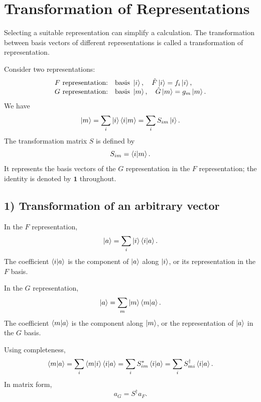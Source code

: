 \section{Transformation of Representations}
Selecting a suitable representation can simplify a calculation. The transformation between basis vectors of different representations is called a transformation of representation.

Consider two representations:
\begin{equation}
\begin{array}{ll}
F\text{ representation:}&\text{basis }\left|i\right\rangle,\quad \hat{F}\left|i\right\rangle=f_i\left|i\right\rangle,\\
G\text{ representation:}&\text{basis }\left|m\right\rangle,\quad \hat{G}\left|m\right\rangle=g_m\left|m\right\rangle.
\end{array}
\end{equation}
We have
\begin{equation}
\left|m\right\rangle=\sum_i\left|i\right\rangle\left\langle i\middle|m\right\rangle=\sum_i S_{im}\left|i\right\rangle.
\end{equation}
The transformation matrix $S$ is defined by
\begin{equation}
S_{im}=\left\langle i\middle|m\right\rangle.
\end{equation}
It represents the basis vectors of the $G$ representation in the $F$ representation; the identity is denoted by $\mathbf1$ throughout.
\subsection*{1) Transformation of an arbitrary vector}
In the $F$ representation,
\begin{equation}
\left|a\right\rangle=\sum_i\left|i\right\rangle\left\langle i\middle|a\right\rangle.
\end{equation}
The coefficient $\left\langle i\middle|a\right\rangle$ is the component of $\left|a\right\rangle$ along $\left|i\right\rangle$, or its representation in the $F$ basis.

In the $G$ representation,
\begin{equation}
\left|a\right\rangle=\sum_m\left|m\right\rangle\left\langle m\middle|a\right\rangle.
\end{equation}
The coefficient $\left\langle m\middle|a\right\rangle$ is the component along $\left|m\right\rangle$, or the representation of $\left|a\right\rangle$ in the $G$ basis.

Using completeness,
\begin{equation}
\left\langle m\middle|a\right\rangle=\sum_i\left\langle m\middle|i\right\rangle\left\langle i\middle|a\right\rangle
=\sum_i S_{im}^*\left\langle i\middle|a\right\rangle
=\sum_i S_{mi}^\dagger\left\langle i\middle|a\right\rangle.
\end{equation}
In matrix form,
\begin{equation}
\boxed{a_G=S^\dagger a_F.}
\end{equation}
